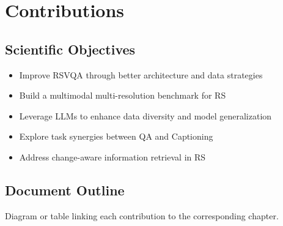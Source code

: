 \chapter{Contributions}
\label{chap:contributions}
 
\section{Scientific Objectives}
\begin{itemize}[leftmargin=1.5em]
    \item Improve RSVQA through better architecture and data strategies
    \item Build a multimodal multi-resolution benchmark for RS
    \item Leverage LLMs to enhance data diversity and model generalization
    \item Explore task synergies between QA and Captioning
    \item Address change-aware information retrieval in RS
\end{itemize}
 
\section{Document Outline}
    Diagram or table linking each contribution to the corresponding chapter.
